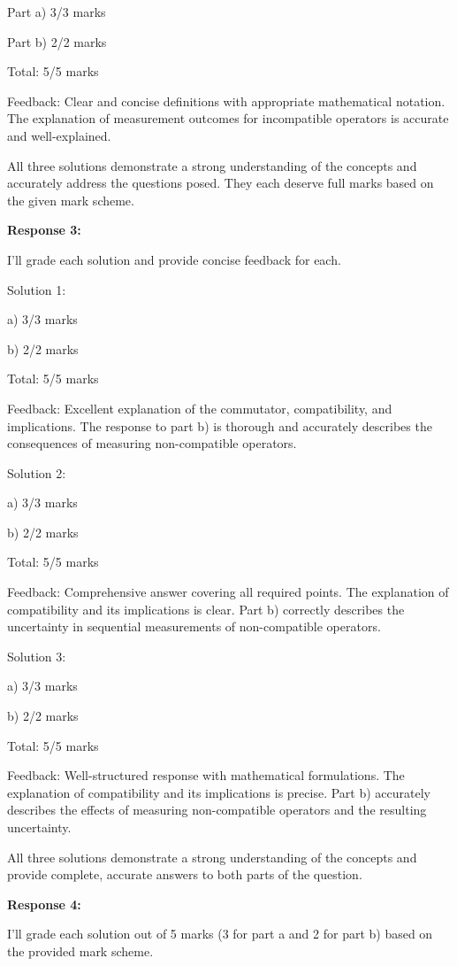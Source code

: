 \documentclass[a4paper,11pt]{article}
\begin{document}
Part a) 3/3 marks

Part b) 2/2 marks

Total: 5/5 marks

Feedback: Clear and concise definitions with appropriate mathematical notation. The explanation of measurement outcomes for incompatible operators is accurate and well-explained.

All three solutions demonstrate a strong understanding of the concepts and accurately address the questions posed. They each deserve full marks based on the given mark scheme.

\bigskip   
\textbf{Response 3:}

I'll grade each solution and provide concise feedback for each.

Solution 1:

a) 3/3 marks

b) 2/2 marks

Total: 5/5 marks

Feedback: Excellent explanation of the commutator, compatibility, and implications. The response to part b) is thorough and accurately describes the consequences of measuring non-compatible operators.

Solution 2:

a) 3/3 marks

b) 2/2 marks

Total: 5/5 marks

Feedback: Comprehensive answer covering all required points. The explanation of compatibility and its implications is clear. Part b) correctly describes the uncertainty in sequential measurements of non-compatible operators.

Solution 3:

a) 3/3 marks

b) 2/2 marks

Total: 5/5 marks

Feedback: Well-structured response with mathematical formulations. The explanation of compatibility and its implications is precise. Part b) accurately describes the effects of measuring non-compatible operators and the resulting uncertainty.

All three solutions demonstrate a strong understanding of the concepts and provide complete, accurate answers to both parts of the question.

\bigskip
\textbf{Response 4:}

I'll grade each solution out of 5 marks (3 for part a and 2 for part b) based on the provided mark scheme.
\end{document}

